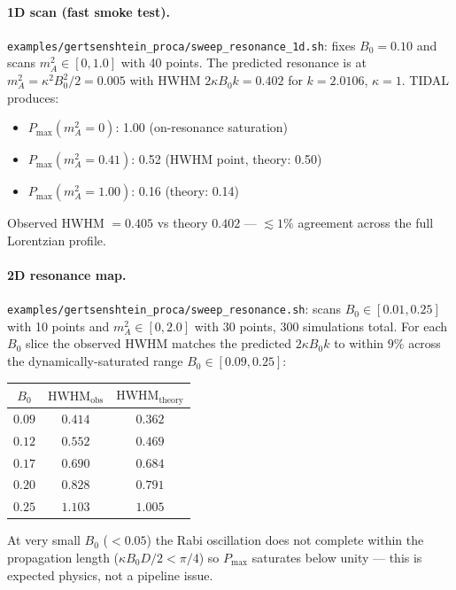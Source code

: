 \paragraph{1D scan (fast smoke test).}
\texttt{examples/gertsenshtein\_proca/sweep\_resonance\_1d.sh}:
fixes $B_0 = 0.10$ and scans $m_A^2 \in [0, 1.0]$ with 40 points. The
predicted resonance is at $m_A^2 = \kappa^2 B_0^2 / 2 = 0.005$ with HWHM
$2\kappa B_0 k = 0.402$ for $k = 2.0106$, $\kappa = 1$. TIDAL produces:
\begin{itemize}
  \item $P_{\max}(m_A^2 = 0)$: 1.00 (on-resonance saturation)
  \item $P_{\max}(m_A^2 = 0.41)$: 0.52 (HWHM point, theory: 0.50)
  \item $P_{\max}(m_A^2 = 1.00)$: 0.16 (theory: 0.14)
\end{itemize}
Observed HWHM $= 0.405$ vs theory $0.402$ --- $\lesssim 1\%$ agreement
across the full Lorentzian profile.

\paragraph{2D resonance map.}
\texttt{examples/gertsenshtein\_proca/sweep\_resonance.sh}: scans
$B_0 \in [0.01, 0.25]$ with 10 points and $m_A^2 \in [0, 2.0]$ with 30
points, 300 simulations total. For each $B_0$ slice the observed HWHM
matches the predicted $2\kappa B_0 k$ to within $9\%$ across the
dynamically-saturated range $B_0 \in [0.09, 0.25]$:

\begin{center}
\begin{tabular}{ccc}
\toprule
$B_0$ & $\mathrm{HWHM}_{\mathrm{obs}}$ & $\mathrm{HWHM}_{\mathrm{theory}}$ \\
\midrule
$0.09$ & $0.414$ & $0.362$ \\
$0.12$ & $0.552$ & $0.469$ \\
$0.17$ & $0.690$ & $0.684$ \\
$0.20$ & $0.828$ & $0.791$ \\
$0.25$ & $1.103$ & $1.005$ \\
\bottomrule
\end{tabular}
\end{center}

At very small $B_0$ ($< 0.05$) the Rabi oscillation does not complete
within the propagation length ($\kappa B_0 D / 2 < \pi/4$) so $P_{\max}$
saturates below unity --- this is expected physics, not a pipeline issue.

